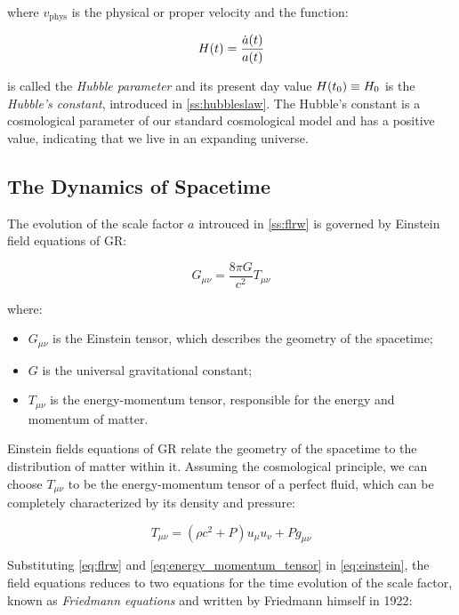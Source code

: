 where $v_{\text{phys}}$ is the physical or proper velocity and the function:

\begin{equation}
        H\qty(t) = \frac{\dot a\qty(t)}{a\qty(t)}
        \label{eq:hubble_parameter}
\end{equation}

is called the \emph{Hubble parameter} and its present day value $H\qty(t_0)
\equiv H_0$ is the \emph{Hubble's constant}, introduced in
\autoref{ss:hubbleslaw}. The Hubble's constant is a cosmological
parameter of our standard cosmological model and has a positive value,
indicating that we live in an expanding universe.

\subsection{The Dynamics of Spacetime}

The evolution of the scale factor $a$ introuced in \autoref{ss:flrw} is
governed by Einstein field equations of GR:

\begin{equation}
        G_{\mu \nu} = \frac{8 \pi G}{c^2} T_{\mu \nu}
        \label{eq:einstein}
\end{equation}

where:

\begin{itemize}
        \item $G_{\mu \nu}$ is the Einstein tensor, which describes the
        geometry of the spacetime;
        \item $G$ is the universal gravitational constant;
        \item $T_{\mu \nu}$ is the energy-momentum tensor, responsible for
        the energy and momentum of matter.
\end{itemize}

Einstein fields equations of GR relate the geometry of the spacetime to the
distribution of matter within it. Assuming the cosmological principle, we
can choose $T_{\mu \nu}$ to be the energy-momentum tensor of a perfect
fluid, which can be completely characterized by its density and pressure:

\begin{equation}
         T_{\mu \nu} = (\rho c^2 + P)u_\mu u_\nu + P g_{\mu \nu} 
         \label{eq:energy_momentum_tensor}
\end{equation}

Substituting \autoref{eq:flrw} and \autoref{eq:energy_momentum_tensor} in
\autoref{eq:einstein}, the field equations reduces to two equations for the
time evolution of the scale factor, known as \emph{Friedmann equations} and
written by Friedmann himself in 1922:

